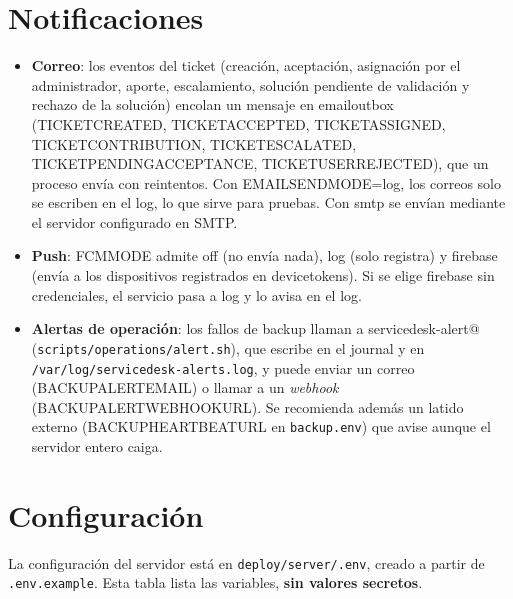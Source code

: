 \documentclass[11pt,a4paper,oneside]{report}
\newcommand{\codus}{\textunderscore\allowbreak}
\DeclareRobustCommand{\cod}[1]{{\small\ttfamily\let\_\codus #1}}
\DeclareRobustCommand{\ruta}[1]{{\small\nolinkurl{#1}}}
\begin{document}
\chapter{Notificaciones}
\begin{itemize}
  \item \textbf{Correo}: los eventos del ticket (creación, aceptación, asignación por el administrador, aporte,
        escalamiento, solución pendiente de validación y rechazo de la solución) encolan un mensaje en
        \cod{email\_outbox} (\cod{TICKET\_CREATED}, \cod{TICKET\_ACCEPTED}, \cod{TICKET\_ASSIGNED},
        \cod{TICKET\_CONTRIBUTION}, \cod{TICKET\_ESCALATED}, \cod{TICKET\_PENDING\_ACCEPTANCE},
        \cod{TICKET\_USER\_REJECTED}), que un proceso envía con reintentos. Con
        \cod{EMAIL\_SEND\_MODE=log}, los correos solo se escriben en el log, lo que sirve para pruebas. Con \cod{smtp} se
        envían mediante el servidor configurado en \cod{SMTP\_*}.
  \item \textbf{Push}: \cod{FCM\_MODE} admite \cod{off} (no envía nada), \cod{log} (solo registra) y
        \cod{firebase} (envía a los dispositivos registrados en \cod{device\_tokens}). Si se elige
        \cod{firebase} sin credenciales, el servicio pasa a \cod{log} y lo avisa en el log.
  \item \textbf{Alertas de operación}: los fallos de backup llaman a \cod{servicedesk-alert@} (\ruta{scripts/operations/alert.sh}), que
        escribe en el journal y en \ruta{/var/log/servicedesk-alerts.log}, y puede enviar un correo
        (\cod{BACKUP\_ALERT\_EMAIL}) o llamar a un \emph{webhook} (\cod{BACKUP\_ALERT\_WEBHOOK\_URL}).
        Se recomienda además un latido externo (\cod{BACKUP\_HEARTBEAT\_URL} en \ruta{backup.env}) que avise aunque el servidor entero caiga.
\end{itemize}

\chapter{Configuración}\label{cap:configuracion}

La configuración del servidor está en \ruta{deploy/server/.env}, creado a partir de
\ruta{.env.example}. Esta tabla lista las variables, \textbf{sin valores secretos}.
\end{document}
